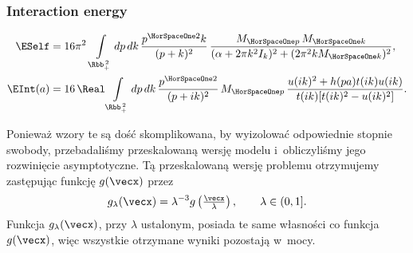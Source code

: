 \documentclass[10pt,t]{beamer}
\begin{document}
\begin{frame}
  \frametitle{Interaction energy}

  \vspace{-2em}


  \begin{subequations}

    \begin{align}
      \label{eq:Pole-skalarne-ETC-05-A}
      \ESelf
      &=
        16 \pi^{ 2 } \, \int\limits_{ \Rbb_{ + }^{ \, 2 } } dp \, dk \,
        \frac{ p^{ \HorSpaceOne 2 } k }{ ( p + k )^{ 2 } } \,
        \frac{ M_{ \HorSpaceOne p } \, M_{ \HorSpaceOne k } }{
        ( \alpha + 2 \pi k^{ 2 } I_{ k } )^{ 2 } +
        ( 2 \pi^{ 2 } k M_{ \HorSpaceOne k } )^{ 2 } }, \\
      \label{eq:Pole-skalarne-ETC-05-B}
      \EInt( a )
      &=
        16 \, \Real \int\limits_{ \Rbb_{ + }^{ \, 2 } } dp \, dk \,
        \frac{ p^{ \HorSpaceOne 2 } }{ ( p + i k )^{ 2 } } \,
        M_{ \HorSpaceOne p } \,
        \frac{ u( i k )^{ 2 } + h( p a ) t( i k ) u( i k ) }{
        t( i k ) [ t( i k )^{ 2 } - u( i k )^{ 2 } ] }.
    \end{align}

  \end{subequations}



  Ponieważ wzory te są dość skomplikowana, by wyizolować odpowiednie
  stopnie swobody, przebadaliśmy przeskalowaną wersję modelu i~obliczyliśmy
  jego rozwinięcie asymptotyczne. Tą przeskalowaną wersję problemu
  otrzymujemy zastępując funkcję $g( \vecx )$ przez
  \begin{equation}
    \label{eq:Pole-skalarne-ETC-06}
    g_{ \lambda }( \vecx ) =
    \lambda^{ -3 } g\left( \tfrac{ \vecx }{ \lambda } \right), \qquad
    \lambda \in ( 0, 1 ].
  \end{equation}
  Funkcja $g_{ \lambda }( \vecx )$, przy $\lambda$ ustalonym, posiada te same
  własności co funkcja $g( \vecx )$, więc wszystkie otrzymane wyniki
  pozostają w~mocy.

\end{frame}
\end{document}
